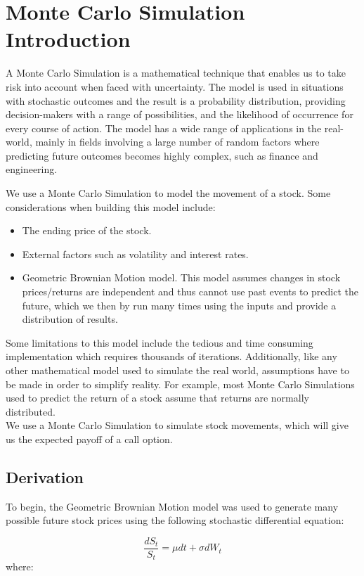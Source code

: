 \section{Monte Carlo Simulation Introduction}
A Monte Carlo Simulation is a mathematical technique that enables us to take risk into account when faced with uncertainty. The model is used in situations with stochastic outcomes and the result is a probability distribution, providing decision-makers with a range of possibilities, and the likelihood of occurrence for every course of action. The model has a wide range of applications in the real-world, mainly in fields involving a large number of random factors where predicting future outcomes becomes highly complex, such as finance and engineering. \cite{MCDS}

We use a Monte Carlo Simulation to model the movement of a stock. Some considerations when building this model include:
\begin{itemize}
\item  The ending price of the stock. 
\item  External factors such as volatility and interest rates.
\item  Geometric Brownian Motion model. This model assumes changes in stock prices/returns are independent and thus cannot use past events to predict the future, which we then by run many times using the inputs and provide a distribution of results.
\end{itemize}
Some limitations to this model include the tedious and time consuming implementation which requires thousands of iterations. Additionally, like any other mathematical model used to simulate the real world, assumptions have to be made in order to simplify reality. For example, most Monte Carlo Simulations used to predict the return of a stock assume that returns are normally distributed.
\\
We use a Monte Carlo Simulation to simulate stock movements, which will give us the expected payoff of a call option. 


\subsection{Derivation}
To begin, the Geometric Brownian Motion model was used to generate many possible future stock prices using the following stochastic differential equation\cite{MCS}:

\begin{equation}
   \frac{dS_{t}}{S_{t}} = \mu dt + \sigma dW_{t}
\end{equation}
where:


